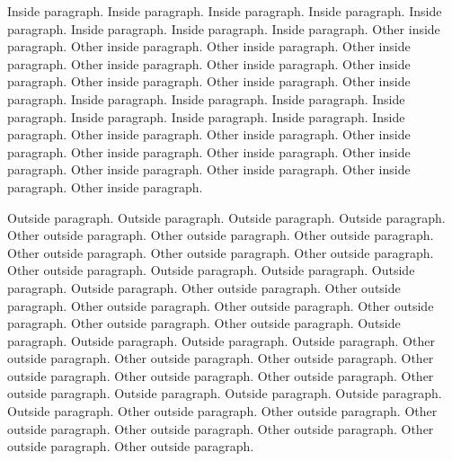 \documentclass{article}
\begin{document}
\begin{pairs}
\begin{Leftside}
                Inside paragraph. Inside paragraph. Inside paragraph. Inside paragraph. Inside paragraph. Inside paragraph. Inside paragraph. Inside paragraph.
            \pend
            \pstart
                Other inside paragraph.  Other inside paragraph.  Other inside paragraph.  Other inside paragraph.  Other inside paragraph.  Other inside paragraph.  Other inside paragraph.  Other inside paragraph.  Other inside paragraph.  Other inside paragraph.
            \pend
                        \pstart
                Inside paragraph. Inside paragraph. Inside paragraph. Inside paragraph. Inside paragraph. Inside paragraph. Inside paragraph. Inside paragraph.
            \pend
            \pstart
                Other inside paragraph.  Other inside paragraph.  Other inside paragraph.  Other inside paragraph.  Other inside paragraph.  Other inside paragraph.  Other inside paragraph.  Other inside paragraph.  Other inside paragraph.  Other inside paragraph.
            \pend
        \endnumbering
    \end{Leftside}
    \begin{Rightside}
        \beginnumbering
            \pstart
                Outside paragraph. Outside paragraph. Outside paragraph. Outside paragraph.
            \pend
            \pstart
                Other outside paragraph. Other outside paragraph. Other outside paragraph. Other outside paragraph. Other outside paragraph. Other outside paragraph. Other outside paragraph.
            \pend
                        \pstart
                Outside paragraph. Outside paragraph. Outside paragraph. Outside paragraph.
            \pend
            \pstart
                Other outside paragraph. Other outside paragraph. Other outside paragraph. Other outside paragraph. Other outside paragraph. Other outside paragraph. Other outside paragraph.
            \pend
                        \pstart
                Outside paragraph. Outside paragraph. Outside paragraph. Outside paragraph.
            \pend
            \pstart
                Other outside paragraph. Other outside paragraph. Other outside paragraph. Other outside paragraph. Other outside paragraph. Other outside paragraph. Other outside paragraph.
            \pend
                        \pstart
                Outside paragraph. Outside paragraph. Outside paragraph. Outside paragraph.
            \pend
            \pstart
                Other outside paragraph. Other outside paragraph. Other outside paragraph. Other outside paragraph. Other outside paragraph. Other outside paragraph. Other outside paragraph.

\end{Rightside}
\end{pairs}
\end{document}
